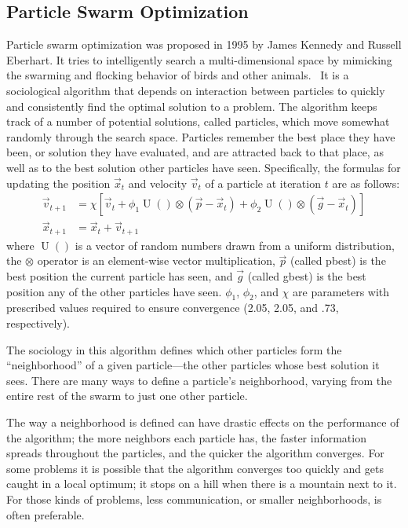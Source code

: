 \documentclass[onecolumn, 12pt]{article}
\DeclareMathOperator{\URand}{U}
\providecommand{\ppos}{\ensuremath{\Vec{x}}}
\providecommand{\pvel}{\ensuremath{\Vec{v}}}
\providecommand{\gbest}{\ensuremath{\Vec{g}}}
\providecommand{\pbest}{\ensuremath{\Vec{p}}}
\providecommand{\constriction}{\ensuremath{\chi}}
\providecommand{\coeff}{\ensuremath{\phi}}
\begin{document}
\subsection{Particle Swarm Optimization}

Particle swarm optimization was proposed in 1995 by James Kennedy and Russell
Eberhart.  It tries to intelligently search a multi-dimensional space by
mimicking the swarming and flocking behavior of birds and other
animals.~\cite{kennedy-icnn95} It is a sociological algorithm that depends on
interaction between particles to quickly and consistently find the optimal
solution to a problem.  The algorithm keeps track of a number of potential
solutions, called particles, which move somewhat randomly through the search
space.  Particles remember the best place they have been, or solution they have
evaluated, and are attracted back to that place, as well as to the best
solution other particles have seen.  Specifically, the formulas for updating
the position $\ppos_t$ and velocity $\pvel_t$ of a particle at iteration $t$ are
as follows:
\begin{align}
\label{eq:velupdate}
	\pvel_{t+1} &=
		\constriction \left[ \pvel_t +
			\coeff_1\URand()\otimes(\pbest - \ppos_t) +
			\coeff_2\URand()\otimes(\gbest - \ppos_t)
		\right] \\
\label{eq:posupdate}
	\ppos_{t+1} &= \ppos_t + \pvel_{t+1}
\end{align}
where \( \URand() \) is a vector of random numbers drawn from a uniform
distribution, the \( \otimes \) operator is an element-wise vector
multiplication, $\pbest$ (called pbest) is the best position the current
particle has seen, and $\gbest$ (called gbest) is the best position any of the
other particles have seen.  \( \coeff_1 \), \( \coeff_2 \), and \(
\constriction \) are parameters with prescribed values required to ensure
convergence (2.05, 2.05, and .73,
respectively).~\cite{clerc-tec02}~\cite{poli-aea08}

The sociology in this algorithm defines which other particles form the
``neighborhood'' of a given particle---the other particles whose best solution
it sees.  There are many ways to define a particle's neighborhood, varying from
the entire rest of the swarm to just one other particle.  

The way a neighborhood is defined can have drastic effects on the performance
of the algorithm; the more neighbors each particle has, the faster information
spreads throughout the particles, and the quicker the algorithm converges.  For
some problems it is possible that the algorithm converges too quickly and gets
caught in a local optimum; it stops on a hill when there is a mountain next to
it.  For those kinds of problems, less communication, or smaller neighborhoods,
is often preferable.
\end{document}
